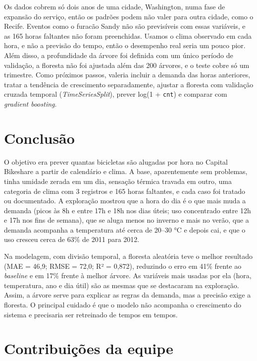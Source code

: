 \documentclass[
  portuguese,
  10pt,
  a4paper,
]{article}
\begin{document}
Os dados cobrem só dois anos de uma cidade, Washington, numa fase de
expansão do serviço, então os padrões podem não valer para outra cidade,
como o Recife. Eventos como o furacão Sandy não são previsíveis com
essas variáveis, e as 165 horas faltantes não foram preenchidas. Usamos
o clima observado em cada hora, e não a previsão do tempo, então o
desempenho real seria um pouco pior. Além disso, a profundidade da
árvore foi definida com um único período de validação, a floresta não
foi ajustada além das 200 árvores, e o teste cobre só um trimestre. Como
próximos passos, valeria incluir a demanda das horas anteriores, tratar
a tendência de crescimento separadamente, ajustar a floresta com
validação cruzada temporal (\emph{TimeSeriesSplit}), prever log(1 +
\texttt{cnt}) e comparar com \emph{gradient boosting}.

\section{Conclusão}\label{conclusuxe3o}

O objetivo era prever quantas bicicletas são alugadas por hora no
Capital Bikeshare a partir de calendário e clima. A base, aparentemente
sem problemas, tinha umidade zerada em um dia, sensação térmica travada
em outro, uma categoria de clima com 3 registros e 165 horas faltantes,
e cada caso foi tratado ou documentado. A exploração mostrou que a hora
do dia é o que mais muda a demanda (picos às 8h e entre 17h e 18h nos
dias úteis; uso concentrado entre 12h e 17h nos fins de semana), que se
aluga menos no inverno e mais no verão, que a demanda acompanha a
temperatura até cerca de 20--30 °C e depois cai, e que o uso cresceu
cerca de 63\% de 2011 para 2012.

Na modelagem, com divisão temporal, a floresta aleatória teve o melhor
resultado (MAE = 46,9; RMSE = 72,0; R² = 0,872), reduzindo o erro em
41\% frente ao \emph{baseline} e em 17\% frente à melhor árvore. As
variáveis mais usadas por ela (hora, temperatura, ano e dia útil) são as
mesmas que se destacaram na exploração. Assim, a árvore serve para
explicar as regras da demanda, mas a precisão exige a floresta. O
principal cuidado é que o modelo não acompanha o crescimento do sistema
e precisaria ser retreinado de tempos em tempos.

\section{Contribuições da equipe}\label{contribuiuxe7uxf5es-da-equipe}
\end{document}
